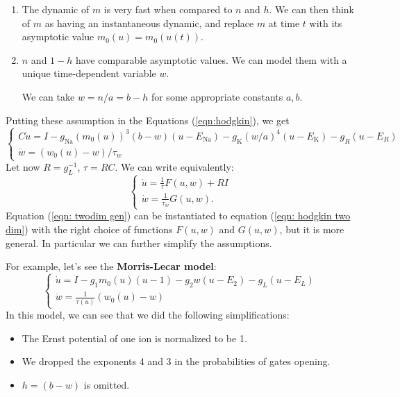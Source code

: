 \documentclass[oneside]{book}
\theoremstyle{definition}
\theoremstyle{plain}
\begin{document}
\begin{enumerate}
    \item The dynamic of $m$ is very fast when compared to $n$ and $h$. We can then think of $m$ as having an instantaneous dynamic, and replace $m$ at time $t$ with its asymptotic value $m_0(u)=m_0(u(t))$.
    \item $n$ and $1-h$ have comparable asymptotic values. We can model them with a unique time-dependent variable $w$.

    We can take $w=n/a = b-h$ for some appropriate constants $a, b$.
\end{enumerate}
Putting these assumption in the Equations (\ref{eqn:hodgkin}), we get
\begin{equation}\label{eqn: hodgkin two dim}
\begin{cases}
C \dot{u} = I- g_{\mathrm{Na}}(m_0(u))^3(b-w)(u- E_{\mathrm{Na}}) 
            - g_{\mathrm{K}}(w/a)^4(u-E_{\mathrm{K}}) -g_{R}(u-E_R) \\
\dot{w} = (w_0(u)-w)/\tau_w
\end{cases}
\end{equation}
Let now $R=g_L^{-1}$, $\tau=RC$. We can write equivalently:
\begin{equation}\label{eqn: twodim gen}
    \begin{cases}
        \dot{u} = \frac{1}{\tau} F(u,w) +RI\\
        \dot{w} =\frac{1}{\tau_w} G(u,w).
    \end{cases}
\end{equation}
Equation (\ref{eqn: twodim gen}) can be instantiated to equation (\ref{eqn: hodgkin two dim}) with the right choice of functions $F(u,w)$ and $G(u,w)$, but it is more general.
In particular we can further simplify the assumptions.

For example, let's see the \textbf{Morris-Lecar model}:
\begin{equation}\label{eqn: morris-lecar}
    \begin{cases}
        \dot{u}= I- g_1 m_0(u)(u-1) -g_2w(u-E_2) -g_L(u-E_L)\\
        \dot{w} = \frac{1}{\tau(u)} (w_0(u)- w)
    \end{cases}
\end{equation}
In this model, we can see that we did the following simplifications:
\begin{itemize}
    \item The Ernst potential of one ion is normalized to be 1.
    \item We dropped the exponents 4 and 3 in the probabilities of gates opening.
    \item $h=(b-w)$ is omitted.
\end{itemize}
\end{document}
